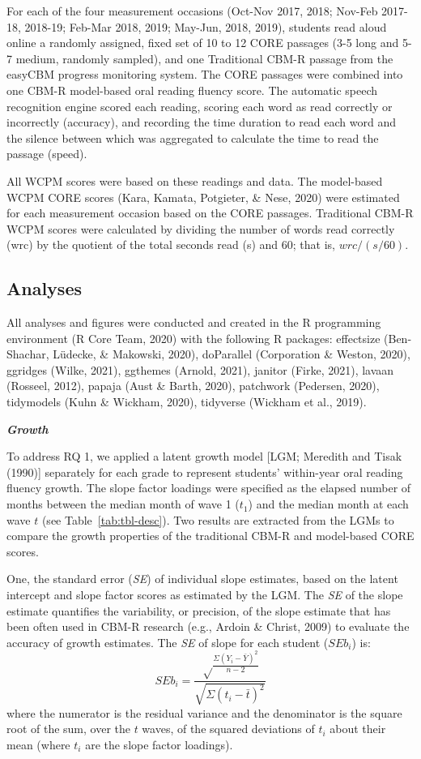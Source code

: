 \documentclass[
  english,
  man, fleqn, noextraspace]{apa6}
\begin{document}
For each of the four measurement occasions (Oct-Nov 2017, 2018; Nov-Feb 2017-18, 2018-19; Feb-Mar 2018, 2019; May-Jun, 2018, 2019), students read aloud online a randomly assigned, fixed set of 10 to 12 CORE passages (3-5 long and 5-7 medium, randomly sampled), and one Traditional CBM-R passage from the easyCBM progress monitoring system. The CORE passages were combined into one CBM-R model-based oral reading fluency score. The automatic speech recognition engine scored each reading, scoring each word as read correctly or incorrectly (accuracy), and recording the time duration to read each word and the silence between which was aggregated to calculate the time to read the passage (speed).

All WCPM scores were based on these readings and data. The model-based WCPM CORE scores (Kara, Kamata, Potgieter, \& Nese, 2020) were estimated for each measurement occasion based on the CORE passages. Traditional CBM-R WCPM scores were calculated by dividing the number of words read correctly (wrc) by the quotient of the total seconds read (s) and 60; that is, \(wrc/(s/60)\).

\hypertarget{analyses}{%
\subsection{Analyses}\label{analyses}}

All analyses and figures were conducted and created in the R programming environment (R Core Team, 2020) with the following R packages: effectsize (Ben-Shachar, Lüdecke, \& Makowski, 2020), doParallel (Corporation \& Weston, 2020), ggridges (Wilke, 2021), ggthemes (Arnold, 2021), janitor (Firke, 2021), lavaan (Rosseel, 2012), papaja (Aust \& Barth, 2020), patchwork (Pedersen, 2020), tidymodels (Kuhn \& Wickham, 2020), tidyverse (Wickham et al., 2019).

\textbf{\emph{Growth}}

To address RQ 1, we applied a latent growth model {[}LGM; Meredith and Tisak (1990){]} separately for each grade to represent students' within-year oral reading fluency growth. The slope factor loadings were specified as the elapsed number of months between the median month of wave 1 (\(t_1\)) and the median month at each wave \(t\) (see Table~\ref{tab:tbl-desc}). Two results are extracted from the LGMs to compare the growth properties of the traditional CBM-R and model-based CORE scores.

One, the standard error (\emph{SE}) of individual slope estimates, based on the latent intercept and slope factor scores as estimated by the LGM. The \emph{SE} of the slope estimate quantifies the variability, or precision, of the slope estimate that has been often used in CBM-R research (e.g., Ardoin \& Christ, 2009) to evaluate the accuracy of growth estimates. The \emph{SE} of slope for each student (\(SEb_i\)) is:
\[
SEb_i = \frac{\sqrt\frac{\Sigma(Y_i - \bar{Y})^2}{n - 2}}{\sqrt{\Sigma(t_i - \bar{t})^2}}
\]
where the numerator is the residual variance and the denominator is the square root of the sum, over the \(t\) waves, of the squared deviations of \(t_i\) about their mean (where \(t_i\) are the slope factor loadings).
\end{document}
